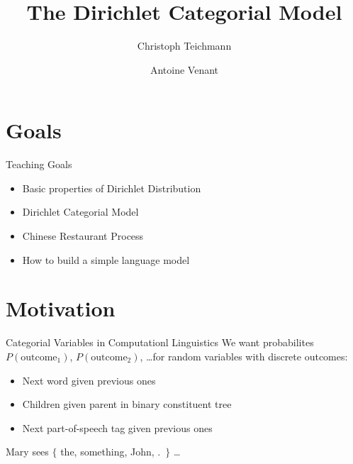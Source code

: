 \documentclass[11pt]{beamer}
\author{Christoph Teichmann \and Antoine Venant}
\title{The Dirichlet Categorial Model}
\subtitle{}
\institute{}
\date{}
\begin{document}
	
	
	\begin{frame}
		\maketitle
	\end{frame}
	
	\section{Goals}
	
	\begin{frame}{Teaching Goals}
		\begin{itemize}
			\item Basic properties of Dirichlet Distribution
			\item Dirichlet Categorial Model
			\item Chinese Restaurant Process
			\item How to build a simple language model
		\end{itemize}
	\end{frame}
	
	\section{Motivation}
	
	\begin{frame}{Categorial Variables in Computationl Linguistics}
		\centering
		We want probabilites $P(\text{outcome}_1)$, $P(\text{outcome}_2)$, \dots for random variables with discrete outcomes:
				
		\begin{itemize}
			\item Next word given previous ones
			\item Children given parent in binary constituent tree
			\item Next part-of-speech tag given previous ones
		\end{itemize}
		
		\vspace{20pt} Mary sees $\lbrace$ the, something, John, .\ $\rbrace$ \dots
	\end{frame}
	
\end{document}
